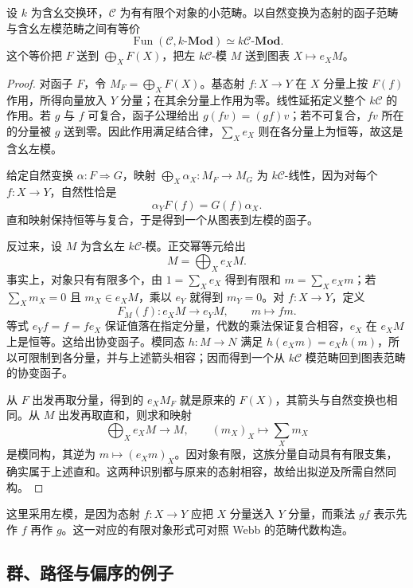 \begin{theorem}\label{b4:thm:category-algebra-representations}
	设 \(k\) 为含幺交换环，\(\mathcal C\) 为有有限个对象的小范畴。以自然变换为态射的函子范畴与含幺左模范畴之间有等价
	\[
		\operatorname{Fun}(\mathcal C,k\text{-}\mathbf{Mod}) \simeq k\mathcal C\text{-}\mathbf{Mod}.
	\]
	这个等价把 \(F\) 送到 \(\bigoplus_XF(X)\)，把左 \(k\mathcal C\)-模 \(M\) 送到图表 \(X\mapsto e_XM\)。
\end{theorem}
\begin{proof}
	对函子 \(F\)，令 \(M_F=\bigoplus_XF(X)\)。基态射 \(f:X\to Y\) 在 \(X\) 分量上按 \(F(f)\) 作用，所得向量放入 \(Y\) 分量；在其余分量上作用为零。线性延拓定义整个 \(k\mathcal C\) 的作用。若 \(g\) 与 \(f\) 可复合，函子公理给出 \(g(fv)=(gf)v\)；若不可复合，\(fv\) 所在的分量被 \(g\) 送到零。因此作用满足结合律，\(\sum_Xe_X\) 则在各分量上为恒等，故这是含幺左模。

	给定自然变换 \(\alpha:F\Rightarrow G\)，映射 \(\bigoplus_X\alpha_X:M_F\to M_G\) 为 \(k\mathcal C\)-线性，因为对每个 \(f:X\to Y\)，自然性恰是
	\[
		\alpha_YF(f)=G(f)\alpha_X.
	\]
	直和映射保持恒等与复合，于是得到一个从图表到左模的函子。

	反过来，设 \(M\) 为含幺左 \(k\mathcal C\)-模。正交幂等元给出
	\[
		M=\bigoplus_Xe_XM.
	\]
	事实上，对象只有有限多个，由 \(1=\sum_Xe_X\) 得到有限和 \(m=\sum_Xe_Xm\)；若 \(\sum_Xm_X=0\) 且 \(m_X\in e_XM\)，乘以 \(e_Y\) 就得到 \(m_Y=0\)。对 \(f:X\to Y\)，定义
	\[
		F_M(f):e_XM\longrightarrow e_YM, \qquad m\longmapsto fm.
	\]
	等式 \(e_Yf=f=fe_X\) 保证值落在指定分量，代数的乘法保证复合相容，\(e_X\) 在 \(e_XM\) 上是恒等。这给出协变函子。模同态 \(h:M\to N\) 满足 \(h(e_Xm)=e_Xh(m)\)，所以可限制到各分量，并与上述箭头相容；因而得到一个从 \(k\mathcal C\) 模范畴回到图表范畴的协变函子。

	从 \(F\) 出发再取分量，得到的 \(e_XM_F\) 就是原来的 \(F(X)\)，其箭头与自然变换也相同。从 \(M\) 出发再取直和，则求和映射
	\[
		\bigoplus_Xe_XM\longrightarrow M, \qquad (m_X)_X\longmapsto\sum_Xm_X
	\]
	是模同构，其逆为 \(m\mapsto(e_Xm)_X\)。因对象有限，这族分量自动具有有限支集，确实属于上述直和。这两种识别都与原来的态射相容，故给出拟逆及所需自然同构。
\end{proof}

这里采用左模，是因为态射 \(f:X\to Y\) 应把 \(X\) 分量送入 \(Y\) 分量，而乘法 \(gf\) 表示先作 \(f\) 再作 \(g\)。这一对应的有限对象形式可对照 Webb 的范畴代数构造\cite[Section 2, Proposition 2.1]{Webb2007CategoryRepresentations}。

\subsection{群、路径与偏序的例子}
\label{b4:subsec:0105:03}

